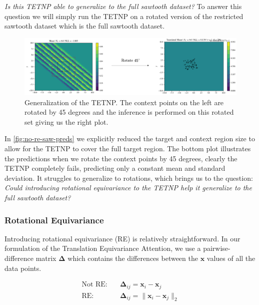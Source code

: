 \documentclass[../../main.tex]{subfiles}
\begin{document}
\emph{Is this TETNP able to generalize to the full sawtooth dataset?} To answer this question we will simply run the TETNP on a rotated version of the restricted sawtooth dataset which is the full sawtooth dataset.




\begin{figure}[H]
    \centering
    \includegraphics[width=1\linewidth]{./fig/res-saw/no-re.png}
    \caption{Generalization of the TETNP. The context points on the left are rotated by 45 degrees and  the inference is performed on this rotated set giving us the right plot.}
    \label{fig:no-re-saw-preds}
\end{figure}

In \autoref{fig:no-re-saw-preds} we explicitly reduced the target and context region size to allow for the TETNP to cover the full target region. The bottom plot illustrates the predictions when we rotate the context points by 45 degrees, clearly the TETNP completely fails, predicting only a constant mean and standard deviation. It struggles to generalize to rotations, which brings us to the question: \emph{Could introducing rotational equivariance to the TETNP help it generalize to the full sawtooth dataset?}

\subsubsection{Rotational Equivariance}

Introducing rotational equivariance (RE) is relatively straightforward. In our formulation of the Translation Equivariance Attention, we use a pairwise-difference matrix $\bm{\Delta}$ which contains the differences between the $\bm{x}$ values of all the data points.

\begin{align}
    \text{Not RE}: \quad &\bm{\Delta}_{ij} = \bm{x}_i - \bm{x}_j\\
    \text{RE}: \quad &\bm{\Delta}_{ij} = \|\bm{x}_i - \bm{x}_j\|_2
\end{align}
\end{document}
